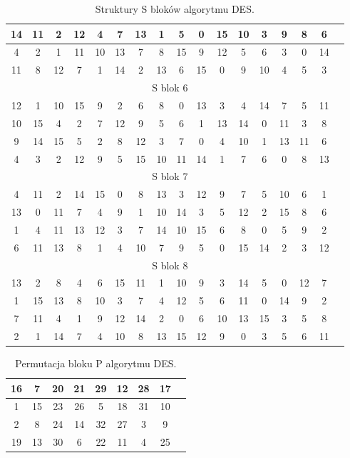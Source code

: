 \documentclass[12p]{article}
\begin{document}
\begin{table}[H]
\begin{adjustbox}{width=0.8\textwidth}
\begin{tabular}{|c|c|c|c|c|c|c|c|c|c|c|c|c|c|c|c|c|}
14& 	11& 	2& 	12& 	4& 	7& 	13& 	1& 	5& 	0& 	15& 	10& 	3& 	9& 	8& 	6\\ \hline
4& 	2& 	1& 	11& 	10& 	13& 	7& 	8& 	15& 	9& 	12& 	5& 	6& 	3& 	0& 	14\\ \hline
11& 	8& 	12& 	7& 	1& 	14& 	2& 	13& 	6& 	15& 	0& 	9& 	10& 	4& 	5& 	3\\ \hline 
\multicolumn{16}{|c|}{S blok 6}\\ \hline
12& 	1& 	10& 	15& 	9& 	2& 	6& 	8& 	0& 	13& 	3& 	4& 	14& 	7& 	5& 	11\\ \hline
10 &	15& 	4& 	2& 	7& 	12& 	9& 	5& 	6& 	1& 	13& 	14& 	0& 	11& 	3& 	8\\ \hline
9& 	14& 	15& 	5& 	2& 	8& 	12& 	3& 	7& 	0& 	4& 	10& 	1& 	13& 	11& 	6\\ \hline
4& 	3& 	2& 	12& 	9& 	5& 	15& 	10& 	11& 	14& 	1& 	7& 	6& 	0& 	8& 	13\\ \hline
\multicolumn{16}{|c|}{S blok 7}\\ \hline
4& 	11& 	2& 	14& 	15& 	0& 	8& 	13& 	3& 	12& 	9& 	7& 	5& 	10& 	6& 	1\\ \hline
13& 	0& 	11& 	7& 	4& 	9& 	1& 	10& 	14& 	3& 	5& 	12& 	2& 	15& 	8& 	6\\ \hline
1& 	4& 	11& 	13& 	12& 	3& 	7& 	14& 	10& 	15& 	6& 	8& 	0& 	5& 	9& 	2\\ \hline
6& 	11& 	13& 	8& 	1& 	4& 	10& 	7& 	9& 	5& 	0& 	15& 	14& 	2& 	3& 	12\\ \hline 
\multicolumn{16}{|c|}{S blok 8}\\ \hline
13& 	2& 	8& 	4& 	6& 	15& 	11& 	1& 	10& 	9& 	3& 	14& 	5& 	0& 	12& 	7\\ \hline
1& 	15& 	13& 	8& 	10& 	3& 	7& 	4& 	12& 	5& 	6& 	11& 	0& 	14& 	9& 	2\\ \hline
7& 	11& 	4& 	1& 	9& 	12& 	14& 	2& 	0& 	6& 	10& 	13& 	15& 	3& 	5& 	8\\ \hline
2& 	1& 	14& 	7& 	4& 	10& 	8& 	13& 	15& 	12& 	9& 	0& 	3& 	5& 	6& 	11 \\ \hline
\end{tabular}
\end{adjustbox}
\caption{Struktury S bloków algorytmu DES.}\label{s_bloki}
\end{table}



\begin{table}[H]
\centering
\begin{tabular}{|c|c|c|c|c|c|c|c|c|}
\hline
16 &	7 &	20& 	21& 	29& 	12& 	28& 	17\\ \hline
1 &	15& 	23& 	26& 	5& 	18& 	31& 	10\\ \hline
2 &	8 &	24 &	14& 	32& 	27& 	3 &	9\\ \hline
19 	&13 &	30& 	6& 	22& 	11& 	4& 	25\\ \hline
\end{tabular}
\caption{Permutacja bloku P algorytmu DES.}~\label{blok_P}
\end{table}
\end{document}
